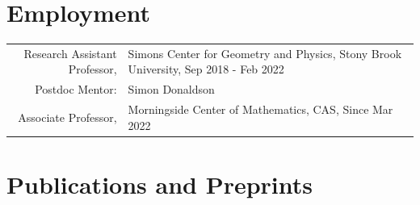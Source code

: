 \documentclass[a4paper,10pt]{article}
\begin{document}
\section*{Employment}
\begin{tabular}{rl}
    Research Assistant Professor, & Simons Center for Geometry and Physics, Stony Brook University, Sep 2018 - Feb 2022 \\
    Postdoc Mentor: & Simon Donaldson \\
    Associate Professor, & Morningside Center of Mathematics, CAS, Since Mar 2022 \\
\end{tabular}

\section*{Publications and Preprints}
\end{document}
